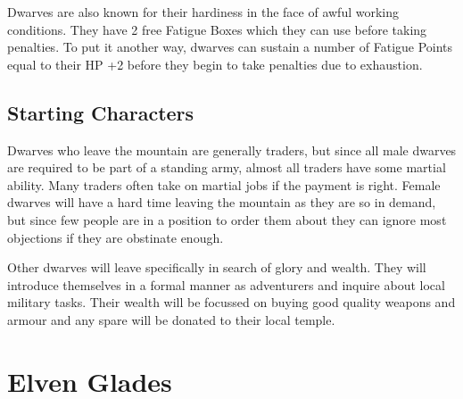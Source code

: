 \begin{multicols}{2}
Dwarves are also known for their hardiness in the face of awful working conditions. They have 2 free Fatigue Boxes which they can use before taking penalties. To put it another way, dwarves can sustain a number of Fatigue Points equal to their HP +2 before they begin to take penalties due to exhaustion.

\subsection{Starting Characters}\label{starting_characters}

Dwarves who leave the mountain are generally traders, but since all male dwarves are required to be part of a standing army, almost all traders have some martial ability. Many traders often take on martial jobs if the payment is right. Female dwarves will have a hard time leaving the mountain as they are so in demand, but since few people are in a position to order them about they can ignore most objections if they are obstinate enough.

Other dwarves will leave specifically in search of glory and wealth. They will introduce themselves in a formal manner as adventurers and inquire about local military tasks. Their wealth will be focussed on buying good quality weapons and armour and any spare will be donated to their local temple.

\end{multicols}

\section[Elves]{Elven Glades}


